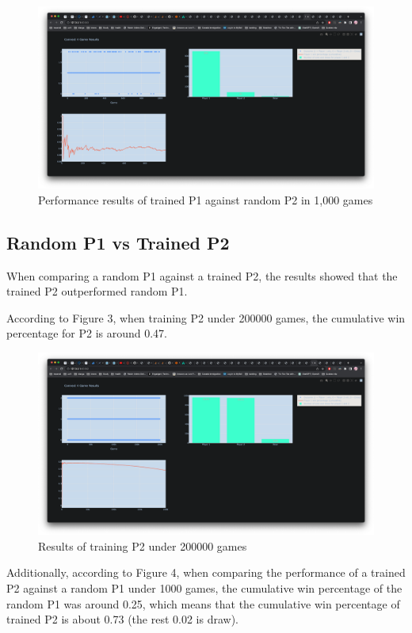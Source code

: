\documentclass{article}
\begin{document}
\begin{figure}[H]
    \centering   \includegraphics[scale=0.24]{images/2.png}
    \caption{Performance results of trained P1 against random P2 in 1,000 games}
    \label{fig:my_label}
\end{figure}

\subsection{Random P1 vs Trained P2}

When comparing a random P1 against a trained P2, the results showed that the trained P2 outperformed random P1.

According to Figure 3, when training P2 under 200000 games, the cumulative win percentage for P2 is around 0.47. 

\begin{figure}[H]
    \centering
    \includegraphics[scale=0.24]{images/3.png}
    \caption{Results of training P2 under 200000 games}
    \label{fig:my_label}
\end{figure}

Additionally, according to Figure 4, when comparing the performance of a trained P2 against a random P1 under 1000 games, the cumulative win percentage of the random P1 was around 0.25, which means that the cumulative win percentage of trained P2 is about 0.73 (the rest 0.02 is draw).
\end{document}
